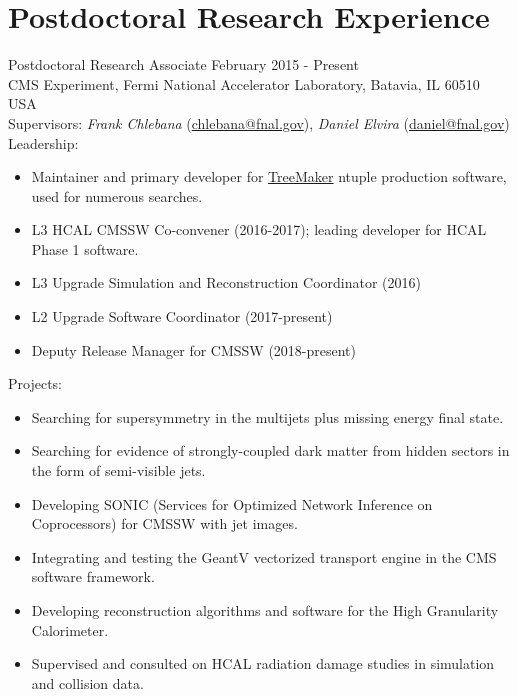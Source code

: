 \setlength{\parskip}{0pt}
\section{Postdoctoral Research Experience}
Postdoctoral Research Associate \hfill February 2015 - Present\\
CMS Experiment, Fermi National Accelerator Laboratory, Batavia, IL 60510 USA\\
Supervisors: {\sl Frank Chlebana} (\href{mailto:chlebana@fnal.gov}{chlebana@fnal.gov}), {\sl Daniel Elvira} (\href{mailto:daniel@fnal.gov}{daniel@fnal.gov})\\
Leadership:
\begin{itemize}[leftmargin=12pt]
\item Maintainer and primary developer for \href{https://github.com/TreeMaker/TreeMaker}{TreeMaker} ntuple production software, used for numerous searches.
\item L3 HCAL CMSSW Co-convener (2016-2017); leading developer for HCAL Phase 1 software.
\item L3 Upgrade Simulation and Reconstruction Coordinator (2016)
\item L2 Upgrade Software Coordinator (2017-present)
\item Deputy Release Manager for CMSSW (2018-present)
\end{itemize}
Projects:
\begin{itemize}[leftmargin=12pt]
\item Searching for supersymmetry in the multijets plus missing energy final state.
\item Searching for evidence of strongly-coupled dark matter from hidden sectors in the form of semi-visible jets.
\item Developing SONIC (Services for Optimized Network Inference on Coprocessors) for CMSSW with jet images.
\item Integrating and testing the GeantV vectorized transport engine in the CMS software framework.
\item Developing reconstruction algorithms and software for the High Granularity Calorimeter.
\item Supervised and consulted on HCAL radiation damage studies in simulation and collision data.
\end{itemize}
